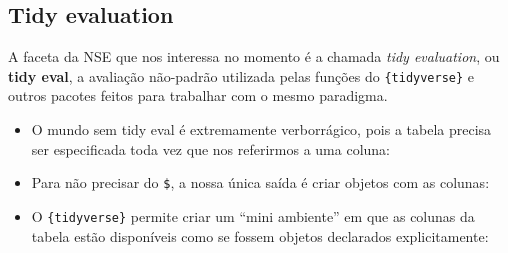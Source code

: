 \documentclass[
]{book}
\newenvironment{Shaded}{\begin{snugshade}}{\end{snugshade}}
\newcommand{\NormalTok}[1]{#1}
\newcommand{\OtherTok}[1]{\textcolor[rgb]{0.56,0.35,0.01}{#1}}
\newcommand{\SpecialCharTok}[1]{\textcolor[rgb]{0.00,0.00,0.00}{#1}}
\newcommand{\StringTok}[1]{\textcolor[rgb]{0.31,0.60,0.02}{#1}}
\providecommand{\tightlist}{%
  \setlength{\itemsep}{0pt}\setlength{\parskip}{0pt}}
\begin{document}
\hypertarget{tidy-evaluation}{%
\subsection{Tidy evaluation}\label{tidy-evaluation}}

A faceta da NSE que nos interessa no momento é a chamada \emph{tidy evaluation}, ou \textbf{tidy eval}, a avaliação não-padrão utilizada pelas funções do \texttt{\{tidyverse\}} e outros pacotes feitos para trabalhar com o mesmo paradigma.

\begin{itemize}
\tightlist
\item
  O mundo sem tidy eval é extremamente verborrágico, pois a tabela precisa ser especificada toda vez que nos referirmos a uma coluna:
\end{itemize}

\begin{Shaded}
\end{Shaded}

\begin{itemize}
\tightlist
\item
  Para não precisar do \texttt{\$}, a nossa única saída é criar objetos com as colunas:
\end{itemize}

\begin{Shaded}
\end{Shaded}

\begin{itemize}
\tightlist
\item
  O \texttt{\{tidyverse\}} permite criar um ``mini ambiente'' em que as colunas da tabela estão disponíveis como se fossem objetos declarados explicitamente:
\end{itemize}
\end{document}
